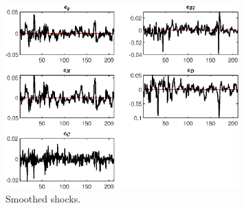  
\begin{figure}[H]
\centering 
\includegraphics[width=0.80\textwidth]{BRS_imp_mobility_alt/graphs/BRS_imp_mobility_alt_SmoothedShocks1}
\caption{Smoothed shocks.}\label{Fig:SmoothedShocks:1}
\end{figure}


